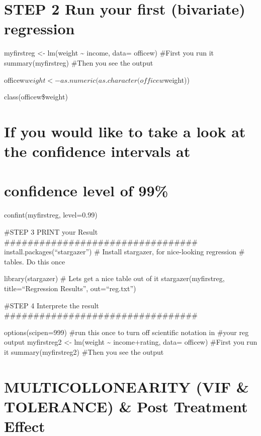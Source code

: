 \documentclass[
]{article}
\begin{document}
\hypertarget{step-2-run-your-first-bivariate-regression}{%
\section{STEP 2 Run your first (bivariate)
regression}\label{step-2-run-your-first-bivariate-regression}}

myfirstreg \textless- lm(weight \textasciitilde{} income, data= officew)
\#First you run it summary(myfirstreg) \#Then you see the output

officew\(weight <- as.numeric(as.character(officew\)weight))

class(officew\$weight)

\hypertarget{if-you-would-like-to-take-a-look-at-the-confidence-intervals-at}{%
\section{If you would like to take a look at the confidence intervals
at}\label{if-you-would-like-to-take-a-look-at-the-confidence-intervals-at}}

\hypertarget{confidence-level-of-99}{%
\section{confidence level of 99\%}\label{confidence-level-of-99}}

confint(myfirstreg, level=0.99)

\#STEP 3 PRINT your Result
\#\#\#\#\#\#\#\#\#\#\#\#\#\#\#\#\#\#\#\#\#\#\#\#\#\#\#\#\#\#\#\#\#
install.packages(``stargazer'') \# Install stargazer, for nice-looking
regression \# tables. Do this once

library(stargazer) \# Lets get a nice table out of it
stargazer(myfirstreg, title=``Regression Results'', out=``reg.txt'')

\#STEP 4 Interprete the result
\#\#\#\#\#\#\#\#\#\#\#\#\#\#\#\#\#\#\#\#\#\#\#\#\#\#\#\#\#\#\#\#\#

options(scipen=999) \#run this once to turn off scientific notation in
\#your reg output myfirstreg2 \textless- lm(weight \textasciitilde{}
income+rating, data= officew) \#First you run it summary(myfirstreg2)
\#Then you see the output

\hypertarget{multicollonearity-vif-tolerance-post-treatment-effect}{%
\section{MULTICOLLONEARITY (VIF \& TOLERANCE) \& Post Treatment
Effect}\label{multicollonearity-vif-tolerance-post-treatment-effect}}
\end{document}

